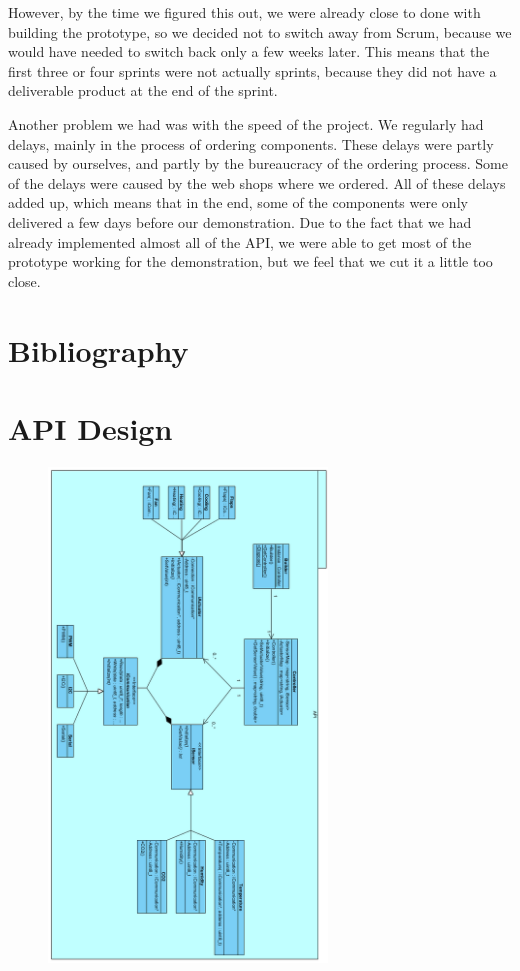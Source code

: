 \documentclass[a4paper,oneside]{book}
\begin{document}
However, by the time we figured this out, we were already close to done with
building the prototype, so we decided not to switch away from Scrum, because we
would have needed to switch back only a few weeks later. This means that the
first three or four sprints were not actually sprints, because they did not
have a deliverable product at the end of the sprint.

Another problem we had was with the speed of the project. We regularly had
delays, mainly in the process of ordering components. These delays were partly
caused by ourselves, and partly by the bureaucracy of the ordering process.
Some of the delays were caused by the web shops where we ordered. All of these
delays added up, which means that in the end, some of the components were only
delivered a few days before our demonstration. Due to the fact that we had
already implemented almost all of the API, we were able to get most of the
prototype working for the demonstration, but we feel that we cut it a little
too close.

\chapter{Bibliography}



\appendix
\chapter{API Design}
\begin{figure}[h]
\centering
\includegraphics[width=0.66\textwidth]{images/apidesign.png}
\end{figure}
\end{document}
